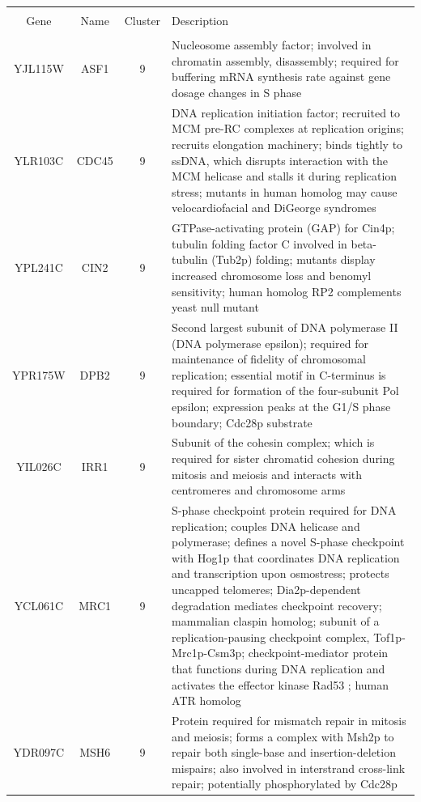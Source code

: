 \documentclass[]{article}
\begin{document}
	\begin{longtable}{@{\extracolsep{3pt}} cccp{85mm}} 
	\\[-1.8ex]\hline 
	\hline \\[-1.8ex] 
Gene & Name & Cluster & Description \\ 
\hline \\[-1.8ex] 
YJL115W & ASF1 & 9 & Nucleosome assembly factor; involved in chromatin assembly, disassembly; required for buffering mRNA synthesis rate against gene dosage changes in S phase \\ 
YLR103C & CDC45 & 9 & DNA replication initiation factor; recruited to MCM pre-RC complexes at replication origins; recruits elongation machinery; binds tightly to ssDNA, which disrupts interaction with the MCM helicase and stalls it during replication stress; mutants in human homolog may cause velocardiofacial and DiGeorge syndromes \\ 
YPL241C & CIN2 & 9 & GTPase-activating protein (GAP) for Cin4p; tubulin folding factor C involved in beta-tubulin (Tub2p) folding; mutants display increased chromosome loss and benomyl sensitivity; human homolog RP2 complements yeast null mutant \\ 
YPR175W & DPB2 & 9 & Second largest subunit of DNA polymerase II (DNA polymerase epsilon); required for maintenance of fidelity of chromosomal replication; essential motif in C-terminus is required for formation of the four-subunit Pol epsilon; expression peaks at the G1/S phase boundary; Cdc28p substrate \\ 
YIL026C & IRR1 & 9 & Subunit of the cohesin complex; which is required for sister chromatid cohesion during mitosis and meiosis and interacts with centromeres and chromosome arms \\ 
YCL061C & MRC1 & 9 & S-phase checkpoint protein required for DNA replication; couples DNA helicase and polymerase; defines a novel S-phase checkpoint with Hog1p that coordinates DNA replication and transcription upon osmostress; protects uncapped telomeres; Dia2p-dependent degradation mediates checkpoint recovery; mammalian claspin homolog; subunit of a replication-pausing checkpoint complex, Tof1p-Mrc1p-Csm3p; checkpoint-mediator protein that functions during DNA replication and activates the effector kinase Rad53 \citep{bando2009csm3}; human ATR homolog \citep{lao2018yeast} \\ 
YDR097C & MSH6 & 9 & Protein required for mismatch repair in mitosis and meiosis; forms a complex with Msh2p to repair both single-base and insertion-deletion mispairs; also involved in interstrand cross-link repair; potentially phosphorylated by Cdc28p \\ 

\end{longtable}
\end{document}
